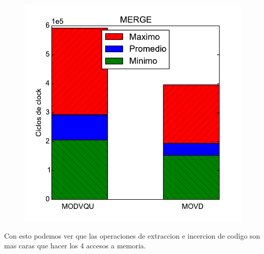 \begin{figure}[h!]
	\centering
	\includegraphics[scale=0.45]{images/merge_extractmov}
\end{figure}

Con esto podemos ver que las operaciones de extraccion e incercion de codigo son mas caras que hacer los 4 accesos a memoria.





